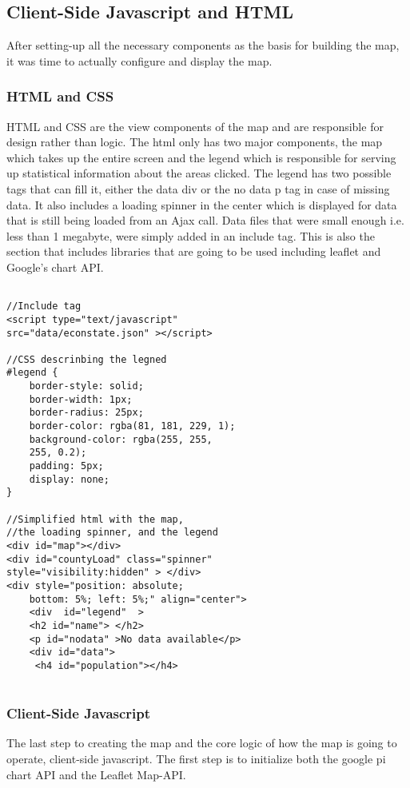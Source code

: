 \documentclass[twoside]{article}
\begin{document}
\begin{multicols}{2}
\subsection{Client-Side Javascript and HTML}

After setting-up all the necessary components as the basis for building the map, it was time to actually configure and display the map. 

\subsubsection{HTML and CSS}
HTML and CSS are the view components of the map and are responsible for design rather than logic. 
The html only has two major components, the map which takes up the entire screen and the legend which is responsible for serving up statistical information about the areas clicked. The legend has two possible tags that can fill it, either the data div or the no data p tag in case of missing data. It also includes a loading spinner in the center which is displayed for data that is still being loaded from an Ajax call. Data files that were small enough i.e. less than 1 megabyte, were simply added in an include tag. This is also the section that includes libraries that are going to be used including leaflet and Google’s chart API.

\begin{verbatim}

//Include tag
<script type="text/javascript" 
src="data/econstate.json" ></script>
   
//CSS descrinbing the legned
#legend {
    border-style: solid;
    border-width: 1px;
    border-radius: 25px;
    border-color: rgba(81, 181, 229, 1);
    background-color: rgba(255, 255, 
    255, 0.2);
    padding: 5px;
    display: none;
}

//Simplified html with the map, 
//the loading spinner, and the legend
<div id="map"></div>
<div id="countyLoad" class="spinner" 
style="visibility:hidden" > </div>
<div style="position: absolute; 
    bottom: 5%; left: 5%;" align="center">
    <div  id="legend"  >
    <h2 id="name"> </h2>
    <p id="nodata" >No data available</p>
    <div id="data">
     <h4 id="population"></h4>
     
\end{verbatim}
\subsubsection{Client-Side Javascript}
The last step to creating the map and the core logic of how the map is going to operate, client-side javascript.
The first step is to initialize both the google pi chart API and the Leaflet Map-API.


\end{multicols}
\end{document}
